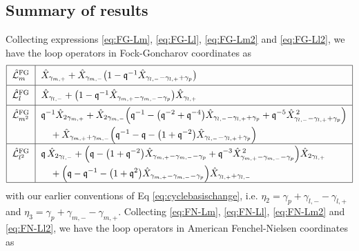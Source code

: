 \documentclass{article}
\numberwithin{equation}{section}
\newcommand{\mq}{\mathfrak{q}}
\newcommand{\FG}{\mathrm{FG}}
\def\CL{\mathcal{L}}
\begin{document}
\subsection{Summary of results}\label{sec:FG-FN-Results}

Collecting expressions \eqref{eq:FG-Lm}, \eqref{eq:FG-Ll}, \eqref{eq:FG-Lm2} and \eqref{eq:FG-Ll2}, we have the loop operators in Fock-Goncharov coordinates as 
\begin{equation}\label{eq:FG-summary}
\renewcommand{\arraystretch}{1.6}
\setlength{\arraycolsep}{6pt}
\begin{array}{|c|l|}
\hline
\hat{\CL}^{\FG}_{m} &
  \hat{X}_{\gamma_{m,+}}
  + \hat{X}_{\gamma_{m,-}}\bigl(1-\mq^{-1}\hat{X}_{\gamma_{l,-}-\gamma_{l,+}+\gamma_p}\bigr)
\\[.4ex]
\hline
\hat{\CL}^{\FG}_{l} &
  \hat{X}_{\gamma_{l,-}}
  + \bigl(1-\mq^{-1}\hat{X}_{\gamma_{m,+}-\gamma_{m,-}-\gamma_p}\bigr)\hat{X}_{\gamma_{l,+}}
\\[.4ex]
\hline
\hat{\CL}^{\FG}_{m^2} &
\begin{aligned}[t]
  &\mq^{-1}\hat{X}_{2\gamma_{m,+}}
   + \hat{X}_{2\gamma_{m,-}}\Bigl(\mq^{-1}
     - \bigl(\mq^{-2}+\mq^{-4}\bigr)\hat{X}_{\gamma_{l,-}-\gamma_{l,+}+\gamma_p}
     + \mq^{-5}\hat{X}_{\gamma_{l,-}-\gamma_{l,+}+\gamma_p}^{\,2}\Bigr) \\
  &\quad + \hat{X}_{\gamma_{m,+}+\gamma_{m,-}}\Bigl(\mq^{-1}-\mq
     - \bigl(1+\mq^{-2}\bigr)\hat{X}_{\gamma_{l,-}-\gamma_{l,+}+\gamma_p}\Bigr)
\end{aligned}
\\[.4ex]
\hline
\hat{\CL}^{\FG}_{l^2} &
\begin{aligned}[t]
  &\mq\,\hat{X}_{2\gamma_{l,-}}
   + \Bigl(\mq
     - \bigl(1+\mq^{-2}\bigr)\hat{X}_{\gamma_{m,+}-\gamma_{m,-}-\gamma_p}
     + \mq^{-3}\hat{X}_{\gamma_{m,+}-\gamma_{m,-}-\gamma_p}^{\,2}\Bigr)\hat{X}_{2\gamma_{l,+}} \\
  &\quad + \Bigl(\mq-\mq^{-1}
     - \bigl(1+\mq^{2}\bigr)\hat{X}_{\gamma_{m,+}-\gamma_{m,-}-\gamma_p}\Bigr)\hat{X}_{\gamma_{l,+}+\gamma_{l,-}}
\end{aligned}
\\[.4ex]
\hline
\end{array}
\end{equation}
with our earlier conventions of Eq \eqref{eq:cyclebasischange}, i.e.  $\eta_2 =\gamma_p+ \gamma_{l,-}-\gamma_{l,+}$ and $\eta_3 = \gamma_p+\gamma_{m,-}-\gamma_{m,+}$. 
Collecting \eqref{eq:FN-Lm}, \eqref{eq:FN-Ll}, \eqref{eq:FN-Lm2} and \eqref{eq:FN-Ll2}, we have the loop operators in American Fenchel-Nielsen coordinates as
\end{document}
